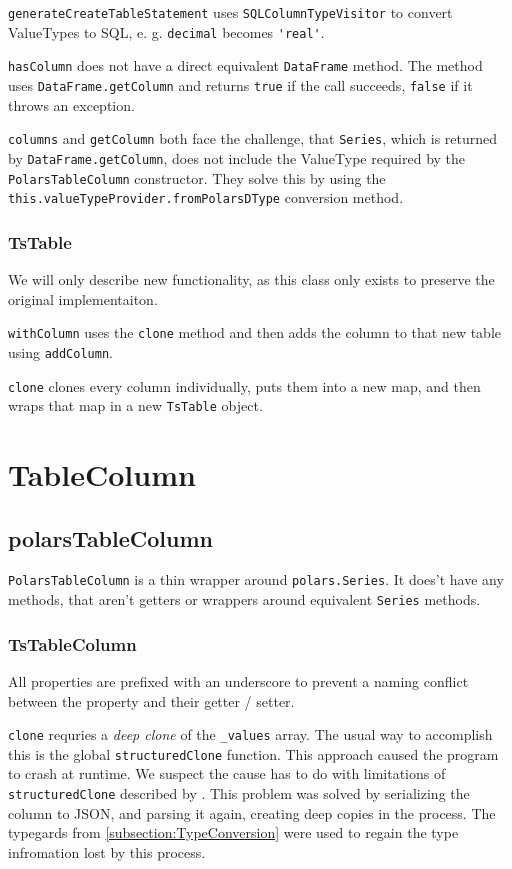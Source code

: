 \Verb|generateCreateTableStatement| uses \Verb|SQLColumnTypeVisitor| to convert ValueTypes to \ac{SQL}, e. g. \Verb|decimal| becomes \Verb|'real'|.

\Verb|hasColumn| does not have a direct equivalent \Verb|DataFrame| method.
The method uses \Verb|DataFrame.getColumn| and returns \Verb|true| if the call succeeds, \Verb|false| if it throws an exception.

\Verb|columns| and \Verb|getColumn| both face the challenge, that \Verb|Series|, which is returned by \Verb|DataFrame.getColumn|, does not include the ValueType required by the \Verb|PolarsTableColumn| constructor.
They solve this by using the \Verb|this.valueTypeProvider.fromPolarsDType| conversion method.

\subsubsection{TsTable}
We will only describe new functionality, as this class only exists to preserve the original implementaiton.

\Verb|withColumn| uses the \Verb|clone| method and then adds the column to that new table using \Verb|addColumn|.

\Verb|clone| clones every column individually, puts them into a new map, and then wraps that map in a new \Verb|TsTable| object.

\section{TableColumn}
\subsection{polarsTableColumn}
\Verb|PolarsTableColumn| is a thin wrapper around \Verb|polars.Series|.
It does't have any methods, that aren't getters or wrappers around equivalent \Verb|Series| methods.

\subsubsection{TsTableColumn}
All properties are prefixed with an underscore to prevent a naming conflict between the property and their getter / setter.

\Verb|clone| requries a \emph{deep clone} of the \Verb|_values| array.
The usual way to accomplish this is the global \Verb|structuredClone| function.
This approach caused the program to crash at runtime.
We suspect the cause has to do with limitations of \Verb|structuredClone| described by \textcite{js:docs:structuredClone}.
This problem was solved by serializing the column to \ac{JSON}, and parsing it again, creating deep copies in the process.
The typegards from \ref{subsection:TypeConversion} were used to regain the type infromation lost by this process.


